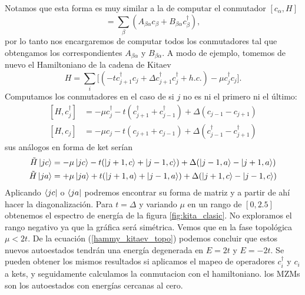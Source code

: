 Notamos que esta forma es muy similar a la de computar el conmutador $[c_\alpha,H]$
\begin{equation}
           [c_\alpha,H] = \sum_\beta(A_{\beta\alpha}c_\beta + B_{\beta\alpha}c^\dagger_\beta), 
           \label{mapeo2}
\end{equation}
por lo tanto nos encargaremos de computar todos los conmutadores tal que obtengamos los correspondientes $A_{\beta\alpha}$ y $B_{\beta\alpha}$.
A modo de ejemplo, tomemos de nuevo el Hamiltoniano de la cadena de Kitaev
\begin{equation}
    H=\sum_i\Big[ (-tc^\dagger_{j+1}c_j + \Delta c^\dagger_{j+1}c^\dagger_j+h.c.) -\mu c^\dagger_j c_j \Big].
\end{equation}
Computamos los conmutadores en el caso de si $j$ no es ni el primero ni el \'{u}ltimo:
\begin{equation}
    \begin{split}
            [H,c^\dagger_j]&=-\mu c^\dagger_j - t(c^\dagger_{j+1}+c^\dagger_{j-1})+\Delta(c_{j-1}-c_{j+1})
            \\
            [H,c_j]&=-\mu c_j - t(c_{j+1}+c_{j-1})+\Delta(c^\dagger_{j-1}-c^\dagger_{j+1})
    \end{split}
\end{equation}
sus an\'{a}logos en forma de ket ser\'{i}an
\begin{equation}
    \begin{split}
        \tilde{H}\ket{j c}&=-\mu\ket{j c}-t(\ket{j+1,c}+\ket{j-1,c})+\Delta(\ket{j-1,a}-\ket{j+1,a})\\
        \tilde{H}\ket{ja}&=+\mu\ket{ja}+t(\ket{j+1,a}+\ket{j-1,a})+\Delta(\ket{j+1,c}-\ket{j-1,c})
    \end{split}
    \label{kitaev_matrix_element}
\end{equation}
Aplicando $\bra{jc}$ o $\bra{ja}$ podremos encontrar su forma de matriz y a partir de ah\'{i} hacer la diagonalizaci\'{o}n. Para $t=\Delta$ y variando $\mu$ en un rango de $[ 0 , 2.5 ]$ obtenemos el espectro de energ\'{i}a de la figura \ref{fig:kita_clasic}. No exploramos el rango negativo ya que la gr\'{a}fica ser\'{a} sim\'{e}trica.  Vemos que en la fase topol\'{o}gica $\mu<2t$. De la ecuaci\'{o}n (\ref{hammy_kitaev_topo}) podemos concluir que estos nuevos autoestados tendr\'{a}n una energ\'{i}a degenerada en $E=2t$ y $E=-2t$. Se pueden obtener los mismos resultados si aplicamos el mapeo de operadores $c_i^\dagger$ y $c_i$ a kets, y seguidamente calculamos la conmutacion con el hamiltoniano. los MZMs son los autoestados con energ\'{i}as cercanas al cero.\\
